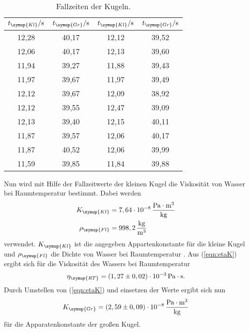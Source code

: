 \begin{table}
  \centering
  \caption{Fallzeiten der Kugeln.}
  \label{tab:Fallzeit}
  \begin{tabular}{c c | c c}
    \toprule
    $t_{\symup{Kl}}/\unit{\second} $ & $t_{\symup{Gr}}/\unit{\second}$ & $t_{\symup{Kl}}/\unit{\second} $ & $t_{\symup{Gr}}/\unit{\second}$ \\
    \midrule
    12,28 & 40,17 & 12,12 & 39,52 \\
    12,06 & 40,17 & 12,13 & 39,60 \\
    11,94 & 39,27 & 11,88 & 39,43 \\
    11,97 & 39,67 & 11,97 & 39,49 \\
    12,12 & 39,67 & 12,09 & 38,92 \\
    12,12 & 39,55 & 12,47 & 39,09 \\
    12,13 & 39,40 & 12,15 & 40,11 \\
    11,87 & 39,57 & 12,06 & 40,17 \\
    11,87 & 40,52 & 12,06 & 39,99 \\
    11,59 & 39,85 & 11,84 & 39,88 \\
    \bottomrule
  \end{tabular}
\end{table}

Nun wird mit Hilfe der Fallzeitwerte der kleinen Kugel die Viskosität von Wasser bei Raumtemperatur bestimmt. Dabei werden
\begin{align*}
  K_{\symup{Kl}} &= 7,64\cdot 10^{-8} \,\frac{\unit{\pascal}\cdot\unit{\meter^3}}{\unit{\kilo\gram}} \\
  \rho_{\symup{Fl}} &= 998,2\,\frac{\unit{\kilo\gram}}{\unit{\meter^3}}
\end{align*}
verwendet. $K_{\symup{Kl}}$ ist die angegeben Appartenkonstante für die kleine Kugel \cite{anleitung107}  und $\rho_{\symup{Fl}}$
die Dichte von Wasser bei Raumtemperatur \cite{waterdensity}. Aus (\ref{eqn:etaK}) ergibt sich für die Viskosität des Wassers bei Raumtemperatur
\begin{align*}
  \eta_{\symup{RT}} = (1,27 \pm 0,02)\cdot 10^{-3} \,\unit{\pascal}\cdot\unit{\second}.
\end{align*}
Durch Umstellen von (\ref{eqn:etaK}) und einsetzen der Werte ergibt sich nun
\begin{align*}
  K_{\symup{Gr}} = (2,59 \pm 0,09)\cdot 10^{-8}\,\frac{\unit{\pascal}\cdot\unit{\meter^3}}{\unit{\kilo\gram}}
\end{align*}
für die Apparatenkonstante der großen Kugel.

